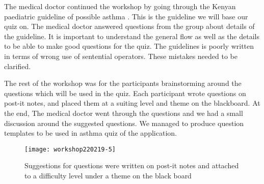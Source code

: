 The medical doctor continued the workshop by going through the Kenyan paediatric guideline of possible asthma \parencite{RepublicofKeny2016}. This is the guideline we will base our quiz on. The medical doctor answered questions from the group about details of the guideline. It is important to understand the general flow as well as the details to be able to make good questions for the quiz. The guidelines is poorly written in terms of wrong use of sentential operators. These mistakes needed to be clarified.

The rest of the workshop was for the participants brainstorming around the questions which will be used in the quiz. Each participant wrote questions on post-it notes, and placed them at a suiting level and theme on the blackboard. At the end, The medical doctor went through the questions and we had a small discussion around the suggested questions. We managed to produce question templates to be used in asthma quiz of the application.

\begin{figure}[h!]
	\texttt{[image: workshop220219-5]}
	\caption {Suggestions for questions were written on post-it notes and attached to a difficulty level under a theme on the black board}
\end{figure}